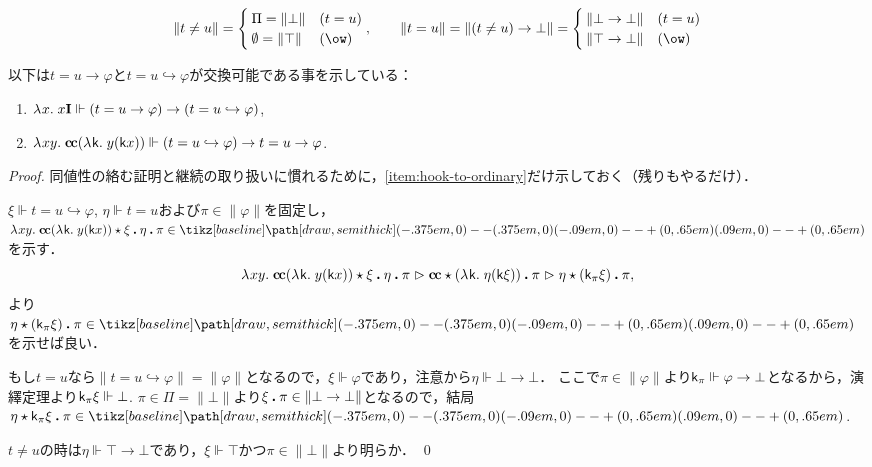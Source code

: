 \documentclass[realisability.tex]{subfiles}
\begin{document}
\begin{remark}
 \[
  \| t \neq u\| =
  \begin{cases}
   \Pi = \|\bot\| & (t = u) \\
   \emptyset = \|\top\| & (\ow)
  \end{cases}, \qquad
  \| t = u \| = \| (t \neq u) \to \bot \|
  = \begin{cases}
     \|\bot \to \bot\|& (t = u)\\
     \|\top \to \bot\|& (\ow)
    \end{cases}
 \]
\end{remark}

以下は$t = u \to \varphi$と$t = u \hookrightarrow \varphi$が交換可能である事を示している：
\begin{lemma}
 \begin{enumerate}
  \item $\lambda^{\mathsf{}}x.\;x \mathsf{\mathbf{I}} \Vdash (t = u \to \varphi) \to (t = u \hookrightarrow \varphi)$,
  \item\label{item:hook-to-ordinary}
       $\lambda^{\mathsf{}}xy.\;\mathsf{\mathbf{c\hspace{-1pt}c}} (\lambda^{\mathsf{}}\mathsf{k}.\;y (\mathsf{k} x)) \Vdash (t = u \hookrightarrow \varphi) \to t = u \to \varphi$.
 \end{enumerate}
\end{lemma}
\begin{proof}
 同値性の絡む証明と継続の取り扱いに慣れるために，\ref{item:hook-to-ordinary}だけ示しておく（残りもやるだけ）．

 $\xi \Vdash t = u \hookrightarrow \varphi$, $\eta \Vdash t = u$および$\pi \in \|\varphi\|$を固定し，$\abs{xy}{\cc (\abs{\conti}{y (\conti x)})} \cons \xi \push \eta \push \pi \in \pole$を示す．
 \[
  \lambda^{\mathsf{}}xy.\;\mathsf{\mathbf{c\hspace{-1pt}c}} (\lambda^{\mathsf{}}\mathsf{k}.\;y (\mathsf{k} x))  \mathbin{\star} \xi \mathbin{\boldsymbol{.}} \eta \mathbin{\boldsymbol{.}} \pi
 \mathrel{\rhd}
  \mathsf{\mathbf{c\hspace{-1pt}c}} \mathbin{\star} (\lambda^{\mathsf{}}\mathsf{k}.\;\eta (\mathsf{k} \xi)) \mathbin{\boldsymbol{.}} \pi
 \mathrel{\rhd}
  \eta \mathbin{\star} (\mathsf{k}_\pi \xi) \mathbin{\boldsymbol{.}} \pi,
 \]
 より$\KVM{\eta {{(\conti_\pi \xi)}} \pi}  \in \pole$を示せば良い．

 もし$t = u$なら$\|t = u \hookrightarrow \varphi\| = \|\varphi\|$となるので，$\xi \Vdash \varphi$であり，注意から$\eta \Vdash \bot \to \bot$．
 ここで$\pi \in \|\varphi\|$より$\mathsf{k}_\pi \Vdash \varphi \to \bot$となるから，演繹定理より$\mathsf{k}_\pi \xi \Vdash \bot$.
 $\pi \in \Pi = \|\bot\|$より$\xi \mathbin{\boldsymbol{.}} \pi \in \|\bot \to \bot\|$となるので，結局$\KVM{\eta {{\conti_\pi \xi}} \pi} \in \pole$.

 $t \neq u$の時は$\eta \Vdash \top \to \bot$であり，$\xi \Vdash \top$かつ$\pi \in \|\bot\|$より明らか． \qed
\end{proof}
\end{document}
